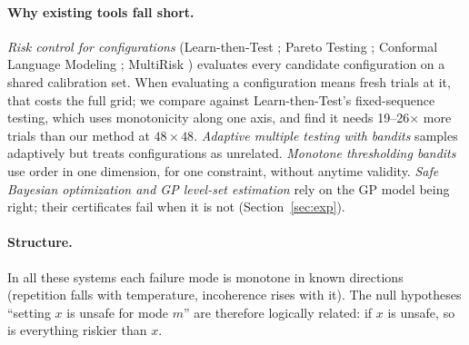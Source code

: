 \documentclass{article}
\begin{document}
\paragraph{Why existing tools fall short.}
\emph{Risk control for configurations} (Learn-then-Test
\citep{angelopoulos2025ltt}; Pareto Testing \citep{laufer2023pareto};
Conformal Language Modeling \citep{quach2024conformal}; MultiRisk
\citep{joshi2025multirisk}) evaluates every candidate configuration on a
shared calibration set. When evaluating a configuration means fresh trials
at it, that costs the full grid; we compare against Learn-then-Test's
fixed-sequence testing, which uses monotonicity along one axis, and find it
needs 19--26$\times$ more trials than our method at $48\times 48$.
\emph{Adaptive multiple testing with bandits} \citep{jamieson2018bandit,
xu2021unified} samples adaptively but treats configurations as unrelated.
\emph{Monotone thresholding bandits} \citep{garivier2017dose,
cheshire2020shape} use order in one dimension, for one constraint, without
anytime validity. \emph{Safe Bayesian optimization and GP level-set
estimation} \citep{sui2015safeopt, gotovos2013lse, losalka2023monotone,
losalka2024noregret} rely on the GP model being right; their certificates
fail when it is not (Section~\ref{sec:exp}).

\paragraph{Structure.} In all these systems each failure mode is monotone
in known directions (repetition falls with temperature, incoherence rises
with it). The null hypotheses ``setting $x$ is unsafe for mode $m$'' are
therefore logically related: if $x$ is unsafe, so is everything riskier
than $x$.
\end{document}
